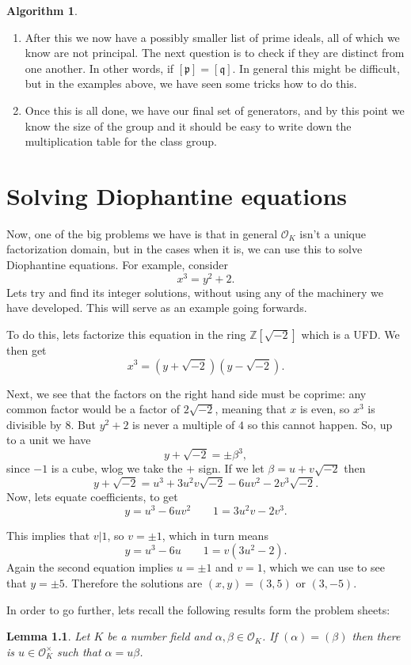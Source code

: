 \documentclass[11pt,a4paper]{report}
\theoremstyle{plain}
\newtheorem{lem}[subsection]{Lemma}
\theoremstyle{definition}
\theoremstyle{definition}
\newtheorem{alg}[subsection]{Algorithm}
\newcommand{\ZZ}{\mathbb{Z}}
\def\gothp{\mathfrak{p}}
\def\gothq{\mathfrak{q}}
\def \a{\alpha}
\def \OO {\mathcal{O}}
\begin{document}
\begin{alg}
\begin{enumerate}
			\item After this we now have a possibly smaller list of prime ideals, all of which we know are not principal. The next question is to check if they are distinct from one another. In other words, if $[\gothp]=[\gothq]$. In general this might be difficult, but in the examples above, we have seen some tricks how to do this.
			
			\item Once this is all done, we have our final set of generators, and by this point we know the size of the group and it should be easy to write down the multiplication table for the class group.
			
		\end{enumerate}
	\end{alg}
	
	
	\chapter{Solving Diophantine equations}
	Now, one of the big problems we have is that in general $\OO_K$ isn't a unique factorization domain, but in the cases when it is, we can use this to solve Diophantine equations. For example, consider \[x^3=y^2+2.\] Lets try and find its integer solutions, without using any of the machinery we have developed. This will serve as an example going forwards.
	
	To do this, lets factorize this equation in the ring $\ZZ[\sqrt{-2}]$ which is a UFD. We then get \[x^3=(y+\sqrt{-2})(y-\sqrt{-2}).\]
	
	Next, we see that the factors on the right hand side must be coprime: any common factor would be a factor of $2\sqrt{-2}$, meaning that $x$ is even, so $x^3$ is divisible by $8$. But $y^2+2$ is never a multiple of $4$ so this cannot happen. So, up to a unit we have \[y+\sqrt{-2}=\pm \beta^3,\] since $-1$ is a cube, wlog we take the $+$ sign. If we let $\beta=u+v\sqrt{-2}$ then \[y+\sqrt{-2}=u^3+3u^2v\sqrt{-2}-6uv^2-2v^3\sqrt{-2}.\] Now, lets equate coefficients, to get \[y=u^3-6uv^2 \qquad 1=3u^2v-2v^3.\]
	
	This implies that $v|1$, so $v=\pm 1$, which in turn means \[y=u^3-6u \qquad 1=v(3u^2-2).\] Again the second equation implies $u=\pm 1$ and $v=1$, which we can use to see that $y=\pm 5$. Therefore the solutions are $(x,y)=(3,5)$ or $(3,-5)$.
	
	In order to go further, lets recall the following results form the problem sheets:
	
	\begin{lem}\label{lem: princ ideals being eq}
		Let $K$ be a number field and $\a,\beta \in \OO_K$. If $(\a)=(\beta)$ then there is  $u \in \OO_K^\times$ such that $\a=u\beta$.
	\end{lem}
	
\end{document}
